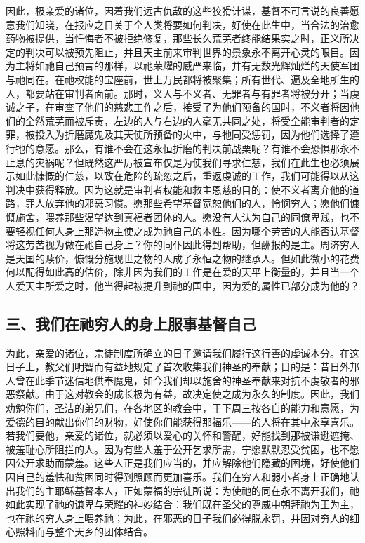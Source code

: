 因此，极亲爱的诸位，因着我们远古仇敌的这些狡猾计谋，基督不可言说的良善愿意我们知晓，在报应之日关于全人类将要如何判决，好使在此生中，当合法的治愈药物被提供，当忏悔者不被拒绝修复，那些长久荒芜者终能结果实之时，正义所决定的判决可以被预先阻止，并且天主前来审判世界的景象永不离开心灵的眼目。因为主将如祂自己预言的那样，以祂荣耀的威严来临，并有无数光辉灿烂的天使军团与祂同在。在祂权能的宝座前，世上万民都将被聚集；所有世代、遍及全地所生的人，都要站在审判者面前。那时，义人与不义者、无罪者与有罪者将被分开；当虔诚之子，在审查了他们的慈悲工作之后，接受了为他们预备的国时，不义者将因他们的全然荒芜而被斥责，左边的人与右边的人毫无共同之处，将受全能审判者的定罪，被投入为折磨魔鬼及其天使所预备的火中，与牠同受惩罚，因为他们选择了遵行牠的意愿。那么，有谁不会在这永恒折磨的判决前战栗呢？有谁不会恐惧那永不止息的灾祸呢？但既然这严厉被宣布仅是为使我们寻求仁慈，我们在此生也必须展示如此慷慨的仁慈，以致在危险的疏忽之后，重返虔诚的工作，我们可能得以从这判决中获得释放。因为这就是审判者权能和救主恩慈的目的：使不义者离弃他的道路，罪人放弃他的邪恶习惯。愿那些希望基督宽恕他们的人，怜悯穷人；愿他们慷慨施舍，喂养那些渴望达到真福者团体的人。愿没有人认为自己的同僚卑贱，也不要轻视任何人身上那造物主使之成为祂自己的本性。因为哪个劳苦的人能否认基督将这劳苦视为做在祂自己身上？你的同仆因此得到帮助，但酬报的是主。周济穷人是天国的赎价，慷慨分施现世之物的人成了永恒之物的继承人。但如此微小的花费何以配得如此高的估价，除非因为我们的工作是在爱的天平上衡量的，并且当一个人爱天主所爱之时，他当得起被提升到祂的国中，因为爱的属性已部分成为他的？\par


\subsection{三、我们在祂穷人的身上服事基督自己}

为此，亲爱的诸位，宗徒制度所确立的日子邀请我们履行这行善的虔诚本分。在这日子上，教父们明智而有益地规定了首次收集我们神圣的奉献；目的是：昔日外邦人曾在此季节迷信地供奉魔鬼，如今我们却以施舍的神圣奉献来对抗不虔敬者的邪恶祭献。由于这对教会的成长极为有益，故决定使之成为永久的制度。因此，我们劝勉你们，圣洁的弟兄们，在各地区的教会中，于下周三按各自的能力和意愿，为爱德的目的献出你们的财物，好使你们能获得那福乐——的人将在其中永享喜乐。若我们要他，亲爱的诸位，就必须以爱心的关怀和警醒，好能找到那被谦逊遮掩、被羞耻心所阻拦的人。因为有些人羞于公开乞求所需，宁愿默默忍受贫困，也不愿因公开求助而蒙羞。这些人正是我们应当的，并应解除他们隐藏的困境，好使他们因自己的羞怯和贫困同时得到照顾而更加喜乐。我们在穷人和弱小者身上正确地认出我们的主耶稣基督本人，正如蒙福的宗徒所说：为使祂的同在永不离开我们，祂如此实现了祂的谦卑与荣耀的神妙结合：我们既在圣父的尊威中朝拜祂为王为主，也在祂的穷人身上喂养祂；为此，在邪恶的日子我们必得脱永罚，并因对穷人的细心照料而与整个天乡的团体结合。\par

